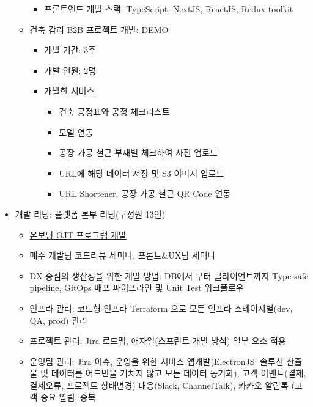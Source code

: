 \begin{itemize}[label=]
\begin{itemize}[label=]
\begin{itemize}[label=]
			            \item 프론트엔드 개발 스택: TypeScript, NextJS, ReactJS, Redux toolkit
		            \end{itemize}
		      \item 건축 감리 B2B 프로젝트 개발: \href{https://asec.builderhub.io/dashboard/detail/initial/supervision}{DEMO} \hyperref[asec]{\space {}}
		            \begin{itemize}[label=]
			            \item 개발 기간: 3주
			            \item 개발 인원: 2명
			            \item 개발한 서비스
			                  \begin{itemize}
				                  \item 건축 공정표와 공정 체크리스트
				                  \item 모델 연동
				                  \item 공장 가공 철근 부재별 체크하여 사진 업로드
				                  \item URL에 해당 데이터 저장 및 S3 이미지 업로드
				                  \item URL Shortener, 공장 가공 철근 QR Code 연동
			                  \end{itemize}
		            \end{itemize}
	      \end{itemize}
	\item 개발 리딩: 플랫폼 본부 리딩(구성원 13인)
	      \begin{itemize}[label=]
		      \item \href{https://organization-pjk.gitbook.io/developer-ojt-program/}{온보딩 OJT 프로그램 개발}
		      \item 매주 개발팀 코드리뷰 세미나, 프론트\&UX팀 세미나
		      \item DX 중심의 생산성을 위한 개발 방법: DB에서 부터 클라이언트까지 Type-safe pipeline, GitOps 배포 파이프라인 및 Unit Test 워크플로우
		      \item 인프라 관리: 코드형 인프라 Terraform 으로 모든 인프라 스테이지별(dev, QA, prod) 관리
		      \item 프로젝트 관리: Jira 로드맵, 애자일(스프린트 개발 방식) 일부 요소 적용
		      \item 운영팀 관리: Jira 이슈, 운영을 위한 서비스 앱개발(ElectronJS: 솔루션 산출물 및 데이터를 어드민을 거치지 않고 모든 데이터 동기화), 고객 이벤트(결제, 결제오류, 프로젝트 상태변경) 대응(Slack, ChannelTalk), 카카오 알림톡 (고객 중요 알림, 중복

\end{itemize}
\end{itemize}
